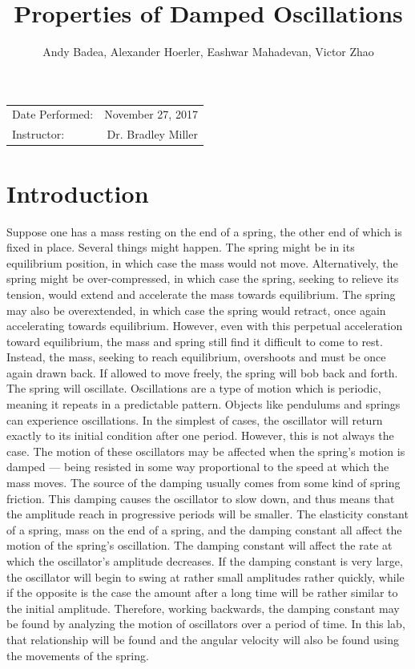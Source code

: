 \documentclass[11pt]{article}
\title{Properties of Damped Oscillations}
\author{Andy Badea, Alexander Hoerler, Eashwar Mahadevan, Victor Zhao}
\begin{document}
\maketitle
\begin{center}
	\begin{tabular}{l r}
		Date Performed: & November 27, 2017 \\ %
		Instructor: & Dr. Bradley Miller %
	\end{tabular}
\end{center}
\section{Introduction}
Suppose one has a mass resting on the end of a spring, the other end of which is fixed in place. Several things might happen. The spring might be in its equilibrium position, in which case the mass would not move. Alternatively, the spring might be over-compressed, in which case the spring, seeking to relieve its tension, would extend and accelerate the mass towards equilibrium. The spring may also be overextended, in which case the spring would retract, once again accelerating towards equilibrium. However, even with this perpetual acceleration toward equilibrium, the mass and spring still find it difficult to come to rest. Instead, the mass, seeking to reach equilibrium, overshoots and must be once again drawn back. If allowed to move freely, the spring will bob back and forth. The spring will oscillate. Oscillations are a type of motion which is periodic, meaning it repeats in a predictable pattern. Objects like pendulums and springs can experience oscillations. In the simplest of cases, the oscillator will return exactly to its initial condition after one period. However, this is not always the case. The motion of these oscillators may be affected when the spring’s motion is damped — being resisted in some way proportional to the speed at which the mass moves. The source of the damping usually comes from some kind of spring friction. This damping causes the oscillator to slow down, and thus means that the amplitude reach in progressive periods will be smaller. The elasticity constant of a spring, mass on the end of a spring, and the damping constant all affect the motion of the spring’s oscillation. The damping constant will affect the rate at which the oscillator’s amplitude decreases. If the damping constant is very large, the oscillator will begin to swing at rather small amplitudes rather quickly, while if the opposite is the case the amount after a long time will be rather similar to the initial amplitude. Therefore, working backwards, the damping constant may be found by analyzing the motion of oscillators over a period of time. In this lab, that relationship will be found and the angular velocity will also be found using the movements of the spring.
\end{document}
